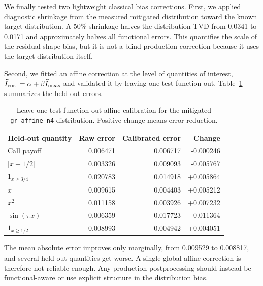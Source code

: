 We finally tested two lightweight classical bias corrections. First, we applied
diagnostic shrinkage from the measured mitigated distribution toward the known
target distribution. A 50\% shrinkage halves the distribution TVD from 0.0341
to 0.0171 and approximately halves all functional errors. This quantifies the
scale of the residual shape bias, but it is not a blind production correction
because it uses the target distribution itself.

Second, we fitted an affine correction at the level of quantities of interest,
\(\widehat I_{\rm corr}=\alpha+\beta \widehat I_{\rm meas}\) and validated it
by leaving one test function out.
Table~\ref{tab:gr-affine-functional-calibration} summarizes the held-out
errors.

\begin{table}[h]
\centering
\begin{tabular}{lrrr}
\toprule
Held-out quantity & Raw error & Calibrated error & Change \\
\midrule
Call payoff & 0.006471 & 0.006717 & -0.000246 \\
\(|x-1/2|\) & 0.003326 & 0.009093 & -0.005767 \\
\(1_{x\ge 3/4}\) & 0.020783 & 0.014918 & +0.005864 \\
\(x\) & 0.009615 & 0.004403 & +0.005212 \\
\(x^2\) & 0.011158 & 0.003926 & +0.007232 \\
\(\sin(\pi x)\) & 0.006359 & 0.017723 & -0.011364 \\
\(1_{x\ge 1/2}\) & 0.008993 & 0.004942 & +0.004051 \\
\bottomrule
\end{tabular}
\caption{Leave-one-test-function-out affine calibration for the mitigated
\texttt{gr\_affine\_n4} distribution. Positive change means error reduction.}
\label{tab:gr-affine-functional-calibration}
\end{table}

The mean absolute error improves only marginally, from 0.009529 to 0.008817,
and several held-out quantities get worse. A single global affine correction is
therefore not reliable enough. Any production postprocessing should instead be
functional-aware or use explicit structure in the distribution bias.
